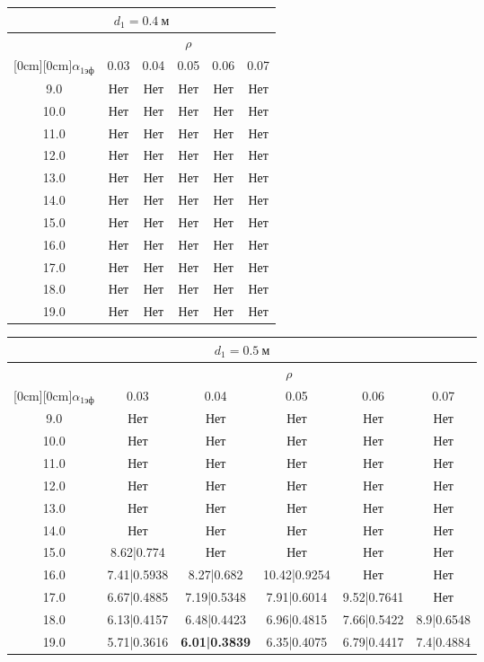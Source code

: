 \documentclass[20pt]{article}
\begin{document}
\begin{center}
\begin{tabular}{c|ccccc}
\hline
	\multicolumn{6}{c}{$d_{1}=0.4 \ м$} \\
\hline
	 & \multicolumn{5}{|c}{$\rho$} \\
	\cline{2-6}
	\raisebox{1.5ex}[0cm][0cm]{$\alpha_{1эф}$} & 0.03 & 0.04 & 0.05 & 0.06 & 0.07\\
\hline
	9.0 & 	Нет & 	Нет & 	Нет & 	Нет & 	Нет\\
	10.0 & 	Нет & 	Нет & 	Нет & 	Нет & 	Нет\\
	11.0 & 	Нет & 	Нет & 	Нет & 	Нет & 	Нет\\
	12.0 & 	Нет & 	Нет & 	Нет & 	Нет & 	Нет\\
	13.0 & 	Нет & 	Нет & 	Нет & 	Нет & 	Нет\\
	14.0 & 	Нет & 	Нет & 	Нет & 	Нет & 	Нет\\
	15.0 & 	Нет & 	Нет & 	Нет & 	Нет & 	Нет\\
	16.0 & 	Нет & 	Нет & 	Нет & 	Нет & 	Нет\\
	17.0 & 	Нет & 	Нет & 	Нет & 	Нет & 	Нет\\
	18.0 & 	Нет & 	Нет & 	Нет & 	Нет & 	Нет\\
	19.0 & 	Нет & 	Нет & 	Нет & 	Нет & 	Нет\\
\end{tabular}

\begin{tabular}{c|ccccc}
\hline
	\multicolumn{6}{c}{$d_{1}=0.5 \ м$} \\
\hline
	 & \multicolumn{5}{|c}{$\rho$} \\
	\cline{2-6}
	\raisebox{1.5ex}[0cm][0cm]{$\alpha_{1эф}$} & 0.03 & 0.04 & 0.05 & 0.06 & 0.07\\
\hline
	9.0 & 	Нет & 	Нет & 	Нет & 	Нет & 	Нет\\
	10.0 & 	Нет & 	Нет & 	Нет & 	Нет & 	Нет\\
	11.0 & 	Нет & 	Нет & 	Нет & 	Нет & 	Нет\\
	12.0 & 	Нет & 	Нет & 	Нет & 	Нет & 	Нет\\
	13.0 & 	Нет & 	Нет & 	Нет & 	Нет & 	Нет\\
	14.0 & 	Нет & 	Нет & 	Нет & 	Нет & 	Нет\\
	15.0 & 	8.62|0.774 & 	Нет & 	Нет & 	Нет & 	Нет\\
	16.0 & 	7.41|0.5938 & 	8.27|0.682 & 	10.42|0.9254 & 	Нет & 	Нет\\
	17.0 & 	6.67|0.4885 & 	7.19|0.5348 & 	7.91|0.6014 & 	9.52|0.7641 & 	Нет\\
	18.0 & 	6.13|0.4157 & 	6.48|0.4423 & 	6.96|0.4815 & 	7.66|0.5422 & 	8.9|0.6548\\
	19.0 & 	5.71|0.3616 & 	\textbf{6.01|0.3839} & 	6.35|0.4075 & 	6.79|0.4417 & 	7.4|0.4884\\
\end{tabular}


\end{center}
\end{document}
